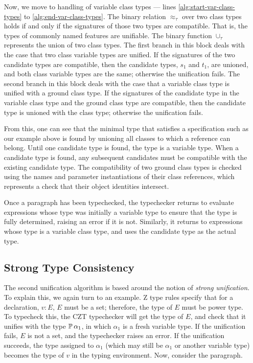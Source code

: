 Now, we move to handling of variable class types --- lines
\ref{alg:start-var-class-types} to \ref{alg:end-var-class-types}. The
binary relation $\approx_{\tau}$ over two class types holds if and
only if the signatures of those two types are compatible. That is, the
types of commonly named features are unifiable. The binary function
$\cup_{\tau}$ represents the union of two class types. The first
branch in this block deals with the case that two class variable types
are unified.  If the signatures of the two candidate types are
compatible, then the candidate types, $s_1$ and $t_1$, are unioned, and
both class variable types are the same; otherwise the unification
fails. The second branch in this block deals with the case that a
variable class type is unified with a ground class type. If the
signatures of the candidate type in the variable class type and the
ground class type are compatible, then the candidate type is unioned
with the class type; otherwise the unification fails.

From this, one can see that the minimal type that satisfies a
specification such as our example above is found by unioning all
classes to which a reference can belong. Until one candidate type is
found, the type is a variable type. When a candidate type is found,
any subsequent candidates must be compatible with the existing
candidate type. The compatibility of two ground class types is checked
using the names and parameter instantiations of their class
references, which represents a check that their object identities
intersect.

Once a paragraph has been typechecked, the typechecker returns to
evaluate expressions whose type was initially a variable type to
ensure that the type is fully determined, raising an error if it is
not. Similarly, it returns to expressions whose type is a variable
class type, and uses the candidate type as the actual type.

\subsection{Strong Type Consistency}

The second unification algorithm is based around the notion of {\em
  strong unification}. To explain this, we again turn to an
  example. Z type rules specify that for a declaration, $v : E$, $E$
  must be a set; therefore, the type of $E$ must be power type. To
  typecheck this, the CZT typechecker will get the type of $E$, and
  check that it unifies with the type $\power \alpha_1$, in which
  $\alpha_1$ is a fresh variable type. If the unification fails, $E$
  is not a set, and the typechecker raises an error. If the
  unification succeeds, the type assigned to $\alpha_1$ (which may
  still be $\alpha_1$ or another variable type) becomes the type of
  $v$ in the typing environment. Now, consider the paragraph.


